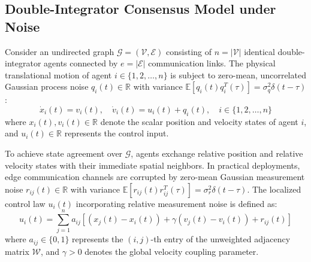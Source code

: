 \subsection{Double-Integrator Consensus Model under Noise}

Consider an undirected graph $\mathcal{G} = (\mathcal{V}, \mathcal{E})$ consisting of $n = |\mathcal{V}|$ identical double-integrator agents connected by $e = |\mathcal{E}|$ communication links. The physical translational motion of agent $i \in \{1, 2, \dots, n\}$ is subject to zero-mean, uncorrelated Gaussian process noise $q_i(t) \in \mathbb{R}$ with variance $\mathbb{E}[q_i(t) q_i^T(\tau)] = \sigma_q^2 \delta(t - \tau)$:
\begin{equation}\label{eq:ch_RA_agent_dynamics}
	\dot{x}_i(t) = v_i(t), \quad \dot{v}_i(t) = u_i(t) + q_i(t), \quad i \in \{1, 2, \dots, n\}
\end{equation}
where $x_i(t), v_i(t) \in \mathbb{R}$ denote the scalar position and velocity states of agent $i$, and $u_i(t) \in \mathbb{R}$ represents the control input.

To achieve state agreement over $\mathcal{G}$, agents exchange relative position and relative velocity states with their immediate spatial neighbors. In practical deployments, edge communication channels are corrupted by zero-mean Gaussian measurement noise $r_{ij}(t) \in \mathbb{R}$ with variance $\mathbb{E}[r_{ij}(t) r_{ij}^T(\tau)] = \sigma_r^2 \delta(t - \tau)$. The localized control law $u_i(t)$ incorporating relative measurement noise is defined as:
\begin{equation}\label{eq:ch_RA_control_law}
	u_i(t) = \sum_{j=1}^{n} a_{ij} \left[ (x_j(t) - x_i(t)) + \gamma (v_j(t) - v_i(t)) + r_{ij}(t) \right]
\end{equation}
where $a_{ij} \in \{0, 1\}$ represents the $(i,j)$-th entry of the unweighted adjacency matrix $\mathcal{W}$, and $\gamma > 0$ denotes the global velocity coupling parameter.

